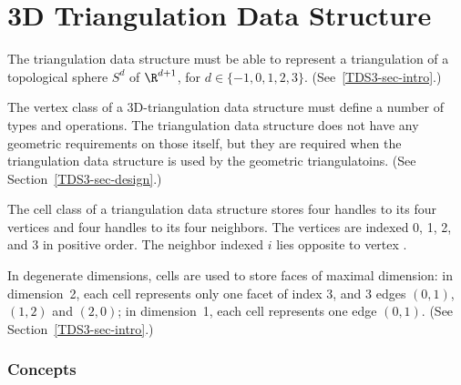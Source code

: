 \chapter{3D Triangulation Data Structure}

The triangulation data structure must be able to represent a
triangulation of a topological sphere $S^d$ of $\R^{d+1}$, for 
$d \in \{-1,0,1,2,3\}$. (See~\ref{TDS3-sec-intro}.)

The vertex class of a 3D-triangulation data structure must define
a number of types and operations.  The triangulation data structure
does not have any geometric requirements on those itself, but they
are required when the triangulation data structure is used by the
geometric triangulatoins. (See Section~\ref{TDS3-sec-design}.)

The cell class of a triangulation data structure stores
four handles to its four vertices and four handles to its four
neighbors. The vertices are indexed 0, 1, 2, and 3 in positive order.
The neighbor indexed $i$ lies opposite to vertex .

In degenerate dimensions, cells are used to store faces of maximal
dimension: in dimension~2, each cell represents only one
facet of index 3, and 3 edges $(0,1)$, $(1,2)$ and $(2,0)$; in
dimension~1, each cell represents one edge $(0,1)$. (See 
Section~\ref{TDS3-sec-intro}.) 

\subsection*{Concepts}


 \\

